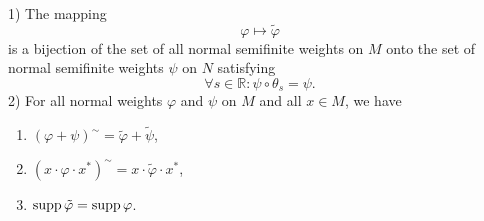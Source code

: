 \begin{lemma}\label{Chap2: lemma: 1}
    1) The mapping 
\[
    \varphi\mapsto \tilde{\varphi}  
\]
    is a bijection of the set of all normal semifinite weights on $M$ onto the set of normal semifinite weights $\psi$ on $N$ satisfying 
    \begin{equation}\label{Chap2: eqn: 13}
        \forall s\in \mathbb{R}:\psi\circ \theta_s=\psi.
    \end{equation}
    2) For all normal weights $\varphi$ and $\psi$ on $M$ and all $x\in M$, we have 
    \begin{enumerate}
        \item $(\varphi+\psi)^\sim=\tilde{\varphi}+\tilde{\psi}$,
        \item $(x\cdot \varphi\cdot x^*)^\sim=x\cdot \tilde{\varphi}\cdot x^*$,
        \item $\operatorname{supp} \tilde{\varphi}=\operatorname{supp} \varphi$.
    \end{enumerate}
\end{lemma}
